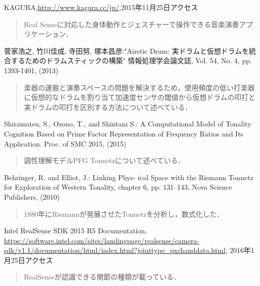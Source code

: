 \begin{thebibliography}{99}
KAGURA,\url{http://www.kagura.cc/jp/},2015年11月25日アクセス
\begin{quote}
	Real Senseに対応した身体動作とジェスチャーで操作できる音楽演奏アプリケーション．
\end{quote}

菅家浩之, 竹川佳成, 寺田努, 塚本昌彦:"Airstic Drum: 実ドラムと仮想ドラムを統合するためのドラムスティックの構築" 情報処理学会論文誌, Vol. 54, No. 4, pp. 1393-1401, (2013)
\begin{quote}
	楽器の運搬と演奏スペースの問題を解決するため，使用頻度の低い打楽器に仮想的なドラムを割り当て加速度センサの閾値から仮想ドラムの叩打と実ドラムの叩打を区別する方法について述べている．
\end{quote}

Shiramatsu, S., Ozono, T., and Shintani S.: A Computational Model of Tonality Cognition Based on Prime Factor Representation of Frequency Ratios and Its Application. Proc. of SMC 2015, (2015)
\begin{quote}
	調性理解モデルPFG Tonnetzについて述べている．
\end{quote}

Behringer, R. and Elliot, J.: Linking Phys- ical Space with the Riemann Tonnetz for Exploration of Western Tonality, chapter 6, pp. 131–143, Nova Science Publishers, (2010)
\begin{quote}
	1880年にRiemannが発展させたTonnetzを分析し，数式化した．
\end{quote}

Intel RealSense SDK 2015 R5 Documentation, \url{https://software.intel.com/sites/landingpage/realsense/camera-sdk/v1.1/documentation/html/index.html?jointtype_pxchanddata.html}, 2016年1月25日アクセス
\begin{quote}
	RealSenseが認識できる関節の種類が載っている．
\end{quote}

\end{thebibliography}
